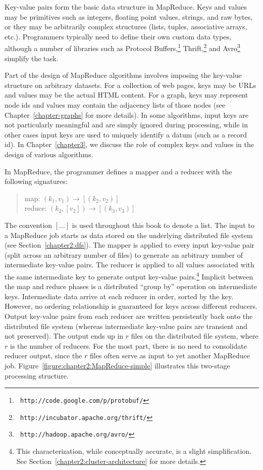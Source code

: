 Key-value pairs form the basic data structure in MapReduce.  Keys and
values may be primitives such as integers, floating point values,
strings, and raw bytes, or they may be arbitrarily complex structures
(lists, tuples, associative arrays, etc.).  Programmers typically need
to define their own custom data types, although a number of libraries
such as Protocol Buffers,\footnote{\tt
http://code.google.com/p/protobuf/} Thrift,\footnote{\tt
http://incubator.apache.org/thrift/} and Avro\footnote{\tt
http://hadoop.apache.org/avro/} simplify the task.

Part of the design of MapReduce algorithms involves imposing the
key-value structure on arbitrary datasets.  For a collection of web
pages, keys may be URLs and values may be the actual HTML content.
For a graph, keys may represent node ids and values may contain the
adjacency lists of those nodes (see Chapter~\ref{chapter-graphs} for
more details). In some algorithms, input keys are not particularly
meaningful and are simply ignored during processing, while in other
cases input keys are used to uniquely identify a datum (such as a
record id).  In Chapter~\ref{chapter3}, we discuss the role of complex
keys and values in the design of various algorithms.

In MapReduce, the programmer defines a mapper and a reducer with the
following signatures:

\begin{quote}
map: $(k_1, v_1) \rightarrow [(k_2, v_2)]$ \\
reduce: $(k_2, [v_2]) \rightarrow [(k_3, v_3)]$
\end{quote}

\noindent The convention $[\ldots]$ is used
throughout this book to denote a list.  The input to a MapReduce job
starts as data stored on the underlying distributed file system (see
Section~\ref{chapter2:dfs}).  The mapper is applied to every input
key-value pair (split across an arbitrary number of files) to generate
an arbitrary number of intermediate key-value pairs.  The reducer is
applied to all values associated with the same intermediate key to
generate output key-value pairs.\footnote{This characterization, while
conceptually accurate, is a slight simplification.  See
Section~\ref{chapter2:cluster-architecture} for more details.}
Implicit between the map and reduce phases is a distributed ``group
by'' operation on intermediate keys.  Intermediate data arrive at each
reducer in order, sorted by the key.  However, no ordering
relationship is guaranteed for keys across different reducers.  Output
key-value pairs from each reducer are written persistently back onto
the distributed file system (whereas intermediate key-value pairs are
transient and not preserved).  The output ends up in $r$ files on the
distributed file system, where $r$ is the number of reducers.  For the
most part, there is no need to consolidate reducer output, since the
$r$ files often serve as input to yet another MapReduce job.
Figure~\ref{figure:chapter2:MapReduce-simple} illustrates this
two-stage processing structure.

